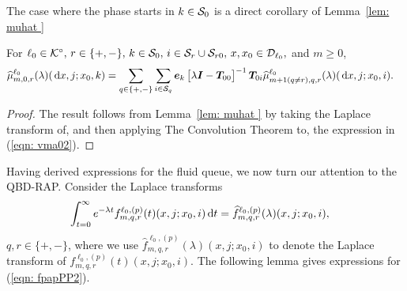 The case where the phase starts in \(k\in\mathcal{S}_0\) is a direct corollary of Lemma~\ref{lem: muhat }
\begin{cor}
	For \(\ell_0\in\mathcal K^\circ,\, r\in\{+,-\},\, k\in\mathcal{S}_0,\, i\in\mathcal{S}_{r}\cup\mathcal{S}_{r0},\, x,x_0\in\mathcal{D}_{\ell_0},\) and \(m\geq 0\), 
	\begin{align}
		\widehat \mu_{m,0,r}^{\ell_0}(\lambda)(\, \mathrm{d} x,j;x_0,k) \label{eqn:kdneee}
		&= \sum_{q\in\{+,-\}}\sum_{i\in\mathcal{S}_q}\boldsymbol e_k\begin{bmatrix} \lambda \boldsymbol I - \boldsymbol T_{00} \end{bmatrix}^{-1}\boldsymbol T_{0i}\widehat \mu_{m+1(q\neq r),q,r}^{\ell_0}(\lambda)(\, \mathrm{d} x,j;x_0,i).
	\end{align}
\end{cor}

\begin{proof}
	The result follows from Lemma~\ref{lem: muhat } by taking the Laplace transform of, and then applying The Convolution Theorem to, the expression in (\ref{eqn: vma02}).
\end{proof}

Having derived expressions for the fluid queue, we now turn our attention to the QBD-RAP. Consider the Laplace transforms
\begin{align}
	\int_{t=0}^\infty e^{-\lambda t} f^{\ell_0,(p)}_{m,q,r}(t)(  x, j; x_0,i) \, \mathrm{d} t  
	&= \widehat f^{\ell_0,(p)}_{m,q,r}(\lambda)( x, j; x_0,i), \label{eqn: fpapPP2}
\end{align}
\(q,r\in\{+,-\}\), where we use \(\widehat f^{\ell_0,(p)}_{m,q,r}(\lambda)(  x, j; x_0,i) \) to denote the Laplace transform of \(f^{\ell_0,(p)}_{m,q,r}(t)(  x, j; x_0,i) \). The following lemma gives expressions for (\ref{eqn: fpapPP2}). 

